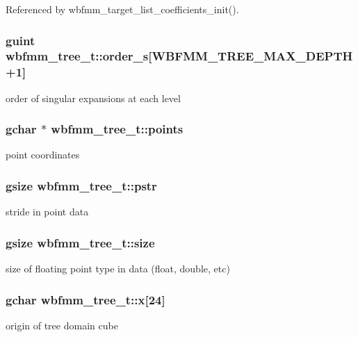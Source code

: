 Referenced by wbfmm\+\_\+target\+\_\+list\+\_\+coefficients\+\_\+init().

\subsubsection[{order\+\_\+s}]{\setlength{\rightskip}{0pt plus 5cm}guint wbfmm\+\_\+tree\+\_\+t\+::order\+\_\+s[W\+B\+F\+M\+M\+\_\+\+T\+R\+E\+E\+\_\+\+M\+A\+X\+\_\+\+D\+E\+P\+T\+H+1]}\label{structwbfmm__tree__t_a4dcb4eecb4b78afa20215a391db8ab0e}
order of singular expansions at each level 
\subsubsection[{points}]{\setlength{\rightskip}{0pt plus 5cm}gchar $\ast$ wbfmm\+\_\+tree\+\_\+t\+::points}\label{structwbfmm__tree__t_a82a6af6a6d054522a860e1a536f6a105}
point coordinates 
\subsubsection[{pstr}]{\setlength{\rightskip}{0pt plus 5cm}gsize wbfmm\+\_\+tree\+\_\+t\+::pstr}\label{structwbfmm__tree__t_a96d1d01546cca1baf4a6a8c953ad1252}
stride in point data 
\subsubsection[{size}]{\setlength{\rightskip}{0pt plus 5cm}gsize wbfmm\+\_\+tree\+\_\+t\+::size}\label{structwbfmm__tree__t_a4bed752b3596b13ad7db8699d4f70060}
size of floating point type in data (float, double, etc) 
\subsubsection[{x}]{\setlength{\rightskip}{0pt plus 5cm}gchar wbfmm\+\_\+tree\+\_\+t\+::x[24]}\label{structwbfmm__tree__t_a44e44f2c0eabe36743d1f975b0d0798c}
origin of tree domain cube 